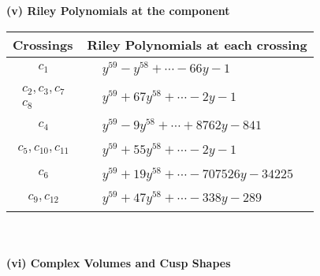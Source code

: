 \documentclass[1p]{elsarticle_modified}
\theoremstyle{definition}
\begin{document}
\newpage\renewcommand{\arraystretch}{1}
\flushleft \textbf{(v) Riley Polynomials at the component}\newline \\
\begin{tabular}{m{50pt}|m{274pt}}
Crossings & \hspace{64pt}Riley Polynomials at each crossing \\
\hline $$\begin{aligned}c_{1}\end{aligned}$$&$\begin{aligned}
&y^{59}- y^{58}+\cdots-66 y-1
\end{aligned}$\\
\hline $$\begin{aligned}c_{2},c_{3},c_{7}\\c_{8}\end{aligned}$$&$\begin{aligned}
&y^{59}+67 y^{58}+\cdots-2 y-1
\end{aligned}$\\
\hline $$\begin{aligned}c_{4}\end{aligned}$$&$\begin{aligned}
&y^{59}-9 y^{58}+\cdots+8762 y-841
\end{aligned}$\\
\hline $$\begin{aligned}c_{5},c_{10},c_{11}\end{aligned}$$&$\begin{aligned}
&y^{59}+55 y^{58}+\cdots-2 y-1
\end{aligned}$\\
\hline $$\begin{aligned}c_{6}\end{aligned}$$&$\begin{aligned}
&y^{59}+19 y^{58}+\cdots-707526 y-34225
\end{aligned}$\\
\hline $$\begin{aligned}c_{9},c_{12}\end{aligned}$$&$\begin{aligned}
&y^{59}+47 y^{58}+\cdots-338 y-289
\end{aligned}$\\
\hline
\end{tabular}\\~\\
\newpage\flushleft \textbf{(vi) Complex Volumes and Cusp Shapes}
\end{document}
